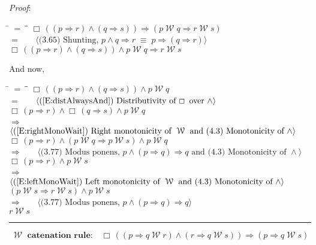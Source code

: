 \documentclass[12pt, fleqn, leqno]{article}
\newcommand{\lgap}{2pt}                             %
\newcommand{\mymathindent}{24pt}                    %
\newcommand{\equivs}{\ensuremath{\;\equiv\;}}       %
\newcommand{\impl}{\ensuremath{\Rightarrow}}        %
\newcommand{\Wait}{\;\mathcal{W}\;}
\newcommand{\Always}{\Box\,}
\newcommand{\myqed}{\rule[-.23ex]{1.2ex}{2.0ex}}
\newcommand{\myqedtab}{\hspace{384pt}}              %
\newcommand{\Gll} {\langle}                         %
\newcommand{\Ggg} {\rangle}                         %
\newcommand{\Hint}[1]     {\ \ \ $\Gll              \mbox{#1} \Ggg$ }   %
\begin{document}
\emph{Proof}:
\begin{tabbing}
\hspace{\mymathindent} \= $= \;$ \= \myqedtab \= \kill
  \> \>   $\Always ((p \impl r) \land (q \impl s)) \impl (p \Wait q \impl r \Wait s)$\\[\lgap]
  \> $=$  \>  \Hint{(3.65) Shunting, $p\land q\impl r\equivs p\impl (q\impl r)$}\\[\lgap]
  \> \>   $\Always ((p \impl r) \land (q \impl s)) \land p \Wait q \impl r \Wait s$
\end{tabbing}
And now,
\begin{tabbing}
\hspace{\mymathindent} \= $= \;$ \= \myqedtab \= \kill
  \> \>   $\Always ((p \impl r) \land (q \impl s)) \land p \Wait q$\\[\lgap]
  \> $=$  \>  \Hint{(\ref{E:distAlwaysAnd}) Distributivity of $\Always$ over $\land$}\\[\lgap]
   \> \>   $\Always (p \impl r) \land \Always (q \impl s) \land p \Wait q$\\[\lgap]
   \> $\impl$  \>  \Hint{(\ref{E:rightMonoWait}) Right monotonicity of $\Wait$ and (4.3) Monotonicity of $\land$}\\[\lgap]
   \> \>   $\Always (p \impl r) \land (p\Wait q \impl p\Wait s) \land p \Wait q$\\[\lgap]
   \> $\impl$  \>  \Hint{(3.77) Modus ponens, $p\land (p\impl q)\impl q$ and (4.3) Monotonicity of $\land$}\\[\lgap]
   \> \>   $\Always (p \impl r) \land p \Wait s$\\[\lgap]
   \> $\impl$  \>  \Hint{(\ref{E:leftMonoWait}) Left monotonicity of $\Wait$ and (4.3) Monotonicity of $\land$}\\[\lgap]
   \> \>   $(p\Wait s \impl r\Wait s) \land p \Wait s$\\[\lgap]
   \> $\impl$  \>  \Hint{(3.77) Modus ponens, $p\land (p\impl q)\impl q$}\\[\lgap]
   \> \>   $r \Wait s$ \quad \myqed
\end{tabbing}
\begin{equation}\label{E:waitCatRule}
\textbf{$\Wait$ catenation rule:}\quad \Always ((p \impl q \Wait r) \land (r \impl q \Wait s)) \impl (p \impl q \Wait s)
\end{equation}
\end{document}
